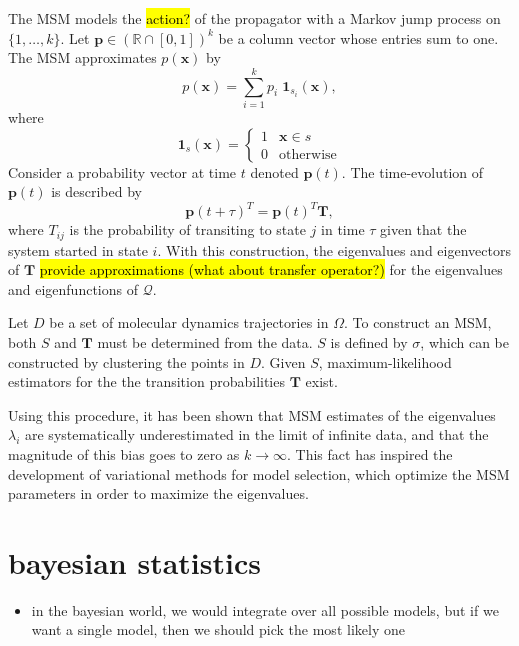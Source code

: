 \documentclass[journal=jpcbfk, layout=traditional, manuscript=article]{achemso}
\begin{document}
The MSM models the \hl{action?} of the propagator with a Markov jump process on $\{1, \ldots, k\}$. Let $\mathbf{p} \in (\mathbb{R} \cap [0,1])^k$ be a column vector whose entries sum to one. The MSM approximates $p(\mathbf{x})$ by
$$
p(\mathbf{x}) = \sum_{i=1}^{k} p_i \; \mathbf{1}_{s_i}(\mathbf{x}),
$$
where
$$
\mathbf{1}_{s}(\mathbf{x}) = \left\{\begin{array}{cc}
1 & \mathbf{x} \in s \\
0 & \text{otherwise}
\end{array}\right.
$$
Consider a probability vector at time $t$ denoted $\mathbf{p}(t)$. The time-evolution of $\mathbf{p}(t)$ is described by
$$
\mathbf{p}(t+\tau)^T = \mathbf{p}(t)^T \mathbf{T},
$$
where $T_{ij}$ is the probability of transiting to state $j$ in time $\tau$ given that the system started in state $i$. With this construction, the eigenvalues and eigenvectors of $\mathbf{T}$ \hl{provide approximations (what about transfer operator?)} for the eigenvalues and eigenfunctions of $\mathcal{Q}$.


Let $D$ be a set of molecular dynamics trajectories in $\Omega$. To construct an MSM, both $S$ and $\mathbf{T}$ must be determined from the data. ${S}$ is defined by $\sigma$, which can be constructed by clustering the points in $D$. Given $S$, maximum-likelihood estimators for the the transition probabilities $\mathbf{T}$ exist\cite{kyle, frank}.

Using this procedure, it has been shown that MSM estimates of the eigenvalues $\lambda_i$ are systematically underestimated in the limit of infinite data, and that the magnitude of this bias goes to zero as $k\rightarrow \infty$. This fact has inspired the development of variational methods for model selection, which optimize the MSM parameters in order to maximize the eigenvalues.


\section{bayesian statistics}
\begin{itemize}
\item in the bayesian world, we would integrate over all possible models, but if we want a single model, then we should pick the most likely one
\end{itemize}
\end{document}
